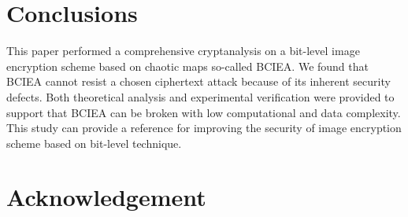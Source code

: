 \documentclass[final,3p,times,twocolumn]{elsarticle}
\begin{document}
\section{Conclusions}


This paper performed a comprehensive cryptanalysis on a bit-level image encryption scheme based on chaotic maps so-called BCIEA. We found that BCIEA cannot resist a chosen ciphertext attack because of its inherent security defects. Both theoretical analysis and experimental verification were provided to support that BCIEA can be broken with low computational and data complexity. This study can provide a reference for improving the security of image encryption scheme based on bit-level technique.


\cite{Shafique2018epjp,MPEanalysis2015infsci,Diaconu2015infsci,Stinson2006,fengw2018ieeepj,wenh2019epjp,zhuzl2011infsci,Lcq:Optimal:SP11,Jolfaei2016TransIFS,Uhl2018Trans,YE2010PRL,fridrich1998symmetric,lic2016sigpro,ozkaynak:review:ND18,shannon1949communication,tengl2017MTA}

\section*{Acknowledgement}




\end{document}
